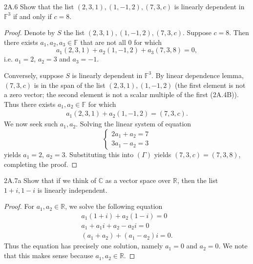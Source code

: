 \documentclass{exam}
\begin{document}
\begin{problem}{2A.6}
    Show that the list $(2, 3, 1), (1, -1, 2), (7, 3, c)$ is linearly dependent in $\mathbb F^3$ if and only if $c = 8$.
\end{problem}

\begin{proof}
    Denote by $S$ the list $(2, 3, 1), (1, -1, 2), (7, 3, c)$. Suppose $c = 8$. Then there exists $a_1, a_2, a_3\in\mathbb F$ that are not all $0$ for which \[
        a_1(2, 3, 1) + a_2(1, -1, 2) + a_3(7, 3, 8) = 0,
    \]
    i.e. $a_1 = 2$, $a_2 = 3$ and $a_3 = -1$.

    Conversely, suppose $S$ is linearly dependent in $\mathbb F^3$. By linear dependence lemma, $(7, 3, c)$ is in the span of the list $(2,3,1),(1,-1,2)$ (the first element is not a zero vector; the second element is not a scalar multiple of the first (2A.4B)). Thus there exists $a_1, a_2\in\mathbb F$ for which 
    \begin{align*}
        a_1(2, 3, 1) + a_2(1, -1, 2) = (7, 3, c).\tag{$\Gamma$}
    \end{align*}
    We now seek such $a_1, a_2$. Solving the linear system of equation \[
        \begin{cases}
            2a_1 + a_2 = 7\\
            3a_1 - a_2 = 3
        \end{cases}
    \]
    yields $a_1 = 2$, $a_2 = 3$. Substituting this into $(\Gamma)$ yields $(7, 3, c) = (7, 3, 8)$, completing the proof.
\end{proof}

\begin{problem}{2A.7a}
    Show that if we think of $\mathbb C$ as a vector space over $\mathbb R$, then the list $1+i, 1-i$ is linearly independent.
\end{problem}

\begin{proof}
    For $a_1, a_2\in\mathbb R$, we solve the following equation
    \begin{align*}
        a_1(1 + i) + a_2(1 - i) = 0\\
        a_1 + a_1i + a_2 - a_2i = 0\\
        (a_1 + a_2) + (a_1 - a_2)i = 0.
    \end{align*}
    Thus the equation has precisely one solution, namely $a_1 = 0$ and $a_2 = 0$. We note that this makes sense because $a_1,a_2\in\mathbb R$.
\end{proof}
\end{document}
